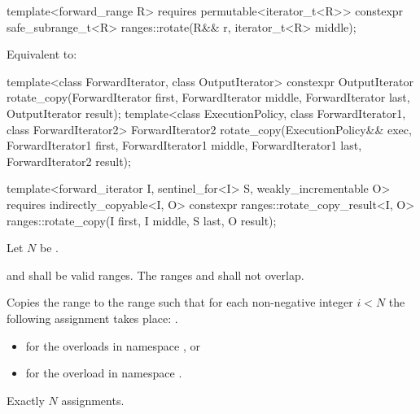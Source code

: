 \begin{itemdecl}
template<forward_range R>
  requires permutable<iterator_t<R>>
  constexpr safe_subrange_t<R> ranges::rotate(R&& r, iterator_t<R> middle);
\end{itemdecl}

\begin{itemdescr}
\pnum
\effects
Equivalent to:
\end{itemdescr}

%
\begin{itemdecl}
template<class ForwardIterator, class OutputIterator>
  constexpr OutputIterator
    rotate_copy(ForwardIterator first, ForwardIterator middle, ForwardIterator last,
                OutputIterator result);
template<class ExecutionPolicy, class ForwardIterator1, class ForwardIterator2>
  ForwardIterator2
    rotate_copy(ExecutionPolicy&& exec,
                ForwardIterator1 first, ForwardIterator1 middle, ForwardIterator1 last,
                ForwardIterator2 result);

  template<forward_iterator I, sentinel_for<I> S, weakly_incrementable O>
    requires indirectly_copyable<I, O>
    constexpr ranges::rotate_copy_result<I, O>
      ranges::rotate_copy(I first, I middle, S last, O result);
\end{itemdecl}

\begin{itemdescr}
\pnum
Let $N$ be .

\pnum
\requires
{} and  shall be valid ranges.
The ranges  and 
shall not overlap.

\pnum
\effects
Copies the range  to the range 
such that for each non-negative integer $i < N$
the following assignment takes place:
.

\pnum
\returns
\begin{itemize}
\item
   for the overloads in namespace , or
\item
   for the overload in namespace .
\end{itemize}

\pnum
\complexity
Exactly $N$ assignments.
\end{itemdescr}

